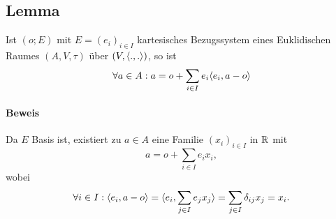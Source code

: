 \subsection{Lemma}
\begin{Lemma}[]
	Ist $ (o;E) $ mit $ E=(e_i)_{i\in I} $ kartesisches Bezugssystem eines Euklidischen Raumes $ (A,V,\tau) $ über $ (V,\langle .,. \rangle) $, so ist 
		\[ \forall a\in A: a = o + \sum_{i\in I} e_i \langle e_i,a-o \rangle \]
\end{Lemma}
\paragraph{Beweis}
	Da $ E $ Basis ist, existiert zu $ a\in A $ eine Familie $ (x_i)_{i\in I} $ in $ \mathbb{R} $ mit
		\[ a = o + \sum_{i\in I}e_ix_i, \]
	wobei
		\[ \forall i\in I: \langle e_i,a-o \rangle = \langle e_i,\sum_{j\in I}e_jx_j \rangle = \sum_{j\in I}\delta_{ij}x_j = x_i. \]